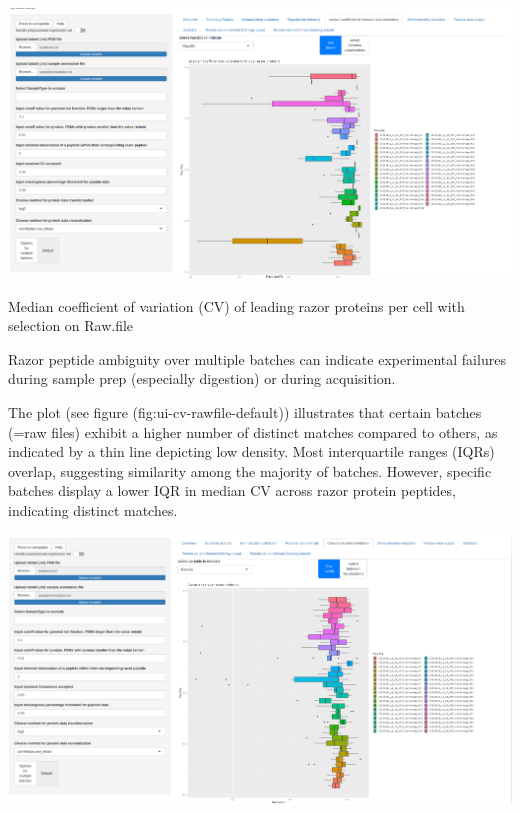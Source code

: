 \documentclass[
  11pt,
]{article}
\let\origfigure\figure
\begin{document}
\newpage
\bgroup  \origfigure[H] 

{\centering \includegraphics[width=1\linewidth]{screenshots/cv_rawfile_default} 

}

\caption{Median coefficient of variation (CV) of leading razor proteins per cell with selection on Raw.file}\label{fig:ui-cv-rawfile-default}
 \endfigure\egroup

Razor peptide ambiguity over multiple batches can indicate experimental failures during sample prep (especially digestion) or during acquisition.

The plot (see figure (fig:ui-cv-rawfile-default)) illustrates that certain batches (=raw files) exhibit a higher number of distinct matches compared to others, as indicated by a thin line depicting low density. Most interquartile ranges (IQRs) overlap, suggesting similarity among the majority of batches. However, specific batches display a lower IQR in median CV across razor protein peptides, indicating distinct matches.

\newpage
\bgroup  \origfigure[H] 

{\centering \includegraphics[width=1\linewidth]{screenshots/cv_rawfile_nobs2} 

}
\end{document}

